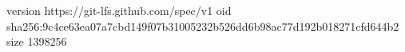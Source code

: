 version https://git-lfs.github.com/spec/v1
oid sha256:9c4ce63ea07a7cbd149f07b31005232b526dd6b98ac77d192b018271cfd644b2
size 1398256
